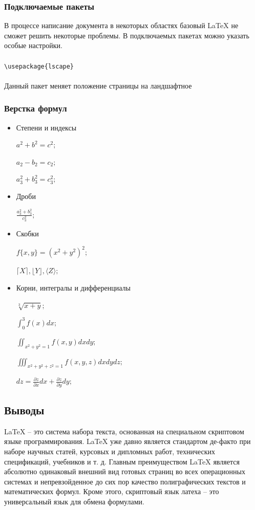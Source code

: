 \documentclass[12pt,a4paper]{article}
\begin{document}
\subsubsection{Подключаемые пакеты}
В процессе написание документа в некоторых областях базовый \LaTeX{} не сможет решить некоторые проблемы. В подключаемых пакетах можно указать особые настройки.
\\\\
\verb+\usepackage{lscape}+
\\\\
Данный пакет меняет положение страницы на ландшафтное

\subsubsection{Верстка формул}
\begin{itemize}
\item Степени и индексы

$a^2+b^2=c^2;$

$a_2-b_2=c_2;$

$a_3^2+b_3^2=c_3^2;$
\item Дроби

$\frac{a_3^2+b_3^2}{c_3^2};$

\item Скобки

$f\{x,y\}=(x^2+y^2)^2 ;$

$\lceil X \rceil, \lfloor Y \rfloor, \langle Z \rangle;$

\item Корни, интегралы и дифференциалы

$\sqrt[3]{x+y};$

$\int_{0}^{3} f(x) dx ;$

$\iint_{x^2 + y^2 = 1} f(x, y) dx dy   ;$

$\iiint_{x^2 + y^2 + z^2 = 1} f(x, y, z) dx dy dz;$

$dz = \frac{\partial z}{\partial x} dx + \frac{\partial z}{\partial y} dy ;$
\end{itemize}

\subsection{Выводы}
\LaTeX{} – это система набора текста, основанная на специальном скриптовом языке программирования. \LaTeX{} уже давно является стандартом де-факто при наборе научных статей, курсовых и дипломных работ, технических спецификаций, учебников и т. д. Главным преимуществом \LaTeX{} является абсолютно одинаковый внешний вид готовых страниц во всех операционных системах и непревзойденное до сих пор качество полиграфических текстов и математических формул. Кроме этого, скриптовый язык латеха – это универсальный язык для обмена формулами.
\end{document}
